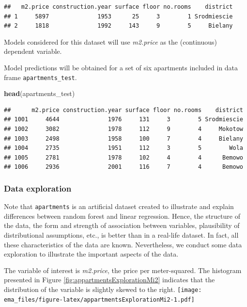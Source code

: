 \documentclass[12pt,]{krantz}
\newenvironment{Shaded}{\begin{snugshade}}{\end{snugshade}}
\newcommand{\KeywordTok}[1]{\textcolor[rgb]{0.13,0.29,0.53}{\textbf{#1}}}
\newcommand{\NormalTok}[1]{#1}
\begin{document}
\begin{verbatim}
##   m2.price construction.year surface floor no.rooms    district
## 1     5897              1953      25     3        1 Srodmiescie
## 2     1818              1992     143     9        5     Bielany
\end{verbatim}

Models considered for this dataset will use \emph{m2.price} as the (continuous) dependent variable.

Model predictions will be obtained for a set of six apartments included in data frame \texttt{apartments\_test}.

\begin{Shaded}
\begin{Highlighting}[]
\KeywordTok{head}\NormalTok{(apartments_test)}
\end{Highlighting}
\end{Shaded}

\begin{verbatim}
##      m2.price construction.year surface floor no.rooms    district
## 1001     4644              1976     131     3        5 Srodmiescie
## 1002     3082              1978     112     9        4     Mokotow
## 1003     2498              1958     100     7        4     Bielany
## 1004     2735              1951     112     3        5        Wola
## 1005     2781              1978     102     4        4      Bemowo
## 1006     2936              2001     116     7        4      Bemowo
\end{verbatim}

\hypertarget{exploration-apartments}{%
\subsubsection{Data exploration}\label{exploration-apartments}}

Note that \texttt{apartments} is an artificial dataset created to illustrate and explain differences between random forest and linear regression. Hence, the structure of the data, the form and strength of association between variables, plausibility of distributional assumptions, etc., is better than in a real-life dataset. In fact, all these characteristics of the data are known. Nevertheless, we conduct some data exploration to illustrate the important aspects of the data.

The variable of interest is \emph{m2.price}, the price per meter-squared. The histogram presented in Figure \ref{fig:appartmentsExplorationMi2} indicates that the distribution of the variable is slightly skewed to the right.
\texttt{[image: ema\_files/figure-latex/appartmentsExplorationMi2-1.pdf]}
\end{document}

